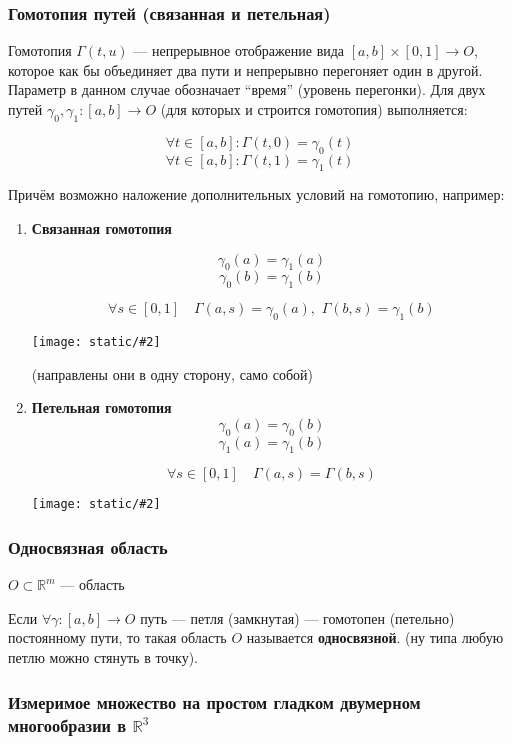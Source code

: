 \documentclass{article}
\def\dbl{\,\,}
\def\images#1#2{\begin{center}\texttt{[image: static/\#2]}\end{center}}
\begin{document}
\subsubsection{Гомотопия путей (связанная и петельная)}

Гомотопия $\Gamma(t, u)$ --- непрерывное отображение вида $[a, b] \times [0, 1] \rightarrow O$, которое как бы объединяет два пути и непрерывно перегоняет один в другой. Параметр в данном случае обозначает ``время'' (уровень перегонки). Для двух путей $\gamma_0, \gamma_1: [a, b] \rightarrow O$ (для которых и строится гомотопия) выполняется:

\[\forall t \in [a, b]: \Gamma(t, 0) = \gamma_0(t)\]
\[\forall t \in [a, b]: \Gamma(t, 1) = \gamma_1(t)\]

Причём возможно наложение дополнительных условий на гомотопию, например:

\begin{enumerate}
    \item \textbf{Связанная гомотопия}
    
    \[\gamma_0(a) = \gamma_1(a)\]
    \[\gamma_0(b) = \gamma_1(b)\]

    \[\forall s \in [0, 1] \quad \Gamma(a, s) = \gamma_0(a), \dbl \Gamma(b, s) = \gamma_1(b)\]

    \images{0.4}{gomotop_sv.jpg}

    (направлены они в одну сторону, само собой)

    \item \textbf{Петельная гомотопия}
    \[\gamma_0(a) = \gamma_0(b)\]
    \[\gamma_1(a) = \gamma_1(b)\]

    \[\forall s \in [0, 1] \quad \Gamma(a, s) = \Gamma(b, s)\]

    \images{0.3}{gomotop_pet.jpg}
\end{enumerate}

\subsubsection{Односвязная область}

$O \subset \mathbb{R}^m$ --- область

Если $\forall \gamma: [a, b] \rightarrow O$ путь --- петля (замкнутая) --- гомотопен (петельно) постоянному пути, то такая область $O$ называется \textbf{односвязной}. (ну типа любую петлю можно стянуть в точку).

\subsubsection{Измеримое множество на простом гладком двумерном многообразии в $\mathbb{R}^3$}
\end{document}
